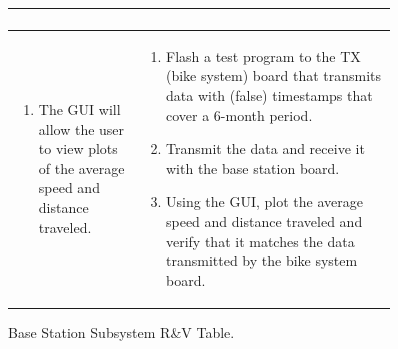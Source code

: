 \documentclass{article}
\begin{document}
\begin{figure}[H]
\begin{center}
\begin{tabular}{|p{0.3 \linewidth}|p{0.6 \linewidth}|}
\begin{enumerate}
			\end{enumerate} \\
			\hline
			\begin{enumerate}
				\item The GUI will allow the user to view plots of the average speed and distance traveled.
			\end{enumerate}  & \begin{enumerate}
				\item Flash a test program to the TX (bike system) board that transmits data with (false) timestamps that cover a 6-month period. 
				\item Transmit the data and receive it with the base station board. 
				\item Using the GUI, plot the average speed and distance traveled and verify that it matches the data transmitted by the bike system board. 
			\end{enumerate} \\
			\hline
			
		\end{tabular}
	\end{center}
	\caption{Base Station Subsystem R\&V Table.}
\end{figure}
\end{document}
